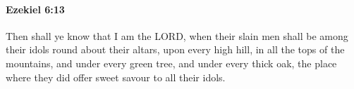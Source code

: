 
		\paragraph{Ezekiel 6:13} %
			\label{EZEKIEL-6-13}

			Then shall ye know that I am the LORD, when their slain men shall be among their idols round about their altars, upon every high hill, in all the tops of the mountains, and under every green tree, and under every thick oak, the place where they did offer sweet savour to all their idols.


